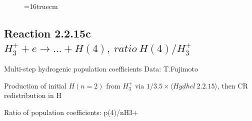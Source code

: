 \documentclass[12pt,dvips]{article}
\begin{document}
\begin{figure} \label{2.2.15b}
\epsfxsize=16truecm
\end{figure}
\newpage


\subsection{
Reaction 2.2.15c $ H_3^+ + e \rightarrow ...+ H(4) , \   ratio ~ H(4)/H_3^+  $
}

 Multi-step hydrogenic population coefficients
 Data: T.Fujimoto

 Production of initial $H(n=2)$ from $H_3^+$ via $1/3.5 \times \langle Hydhel~ 2.2.15\rangle$,
 then CR redistribution in H

 Ratio of population coefficients: p(4)/nH3+
\end{document}
